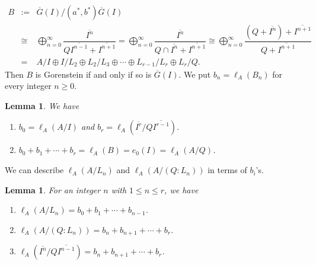 \documentclass[12pt]{amsart}
\newtheorem{lem}[thm]{Lemma}
\theoremstyle{definition}
\theoremstyle{remark}
\numberwithin{equation}{section}
\renewcommand{\:}{\colon}
\begin{document}
\begin{eqnarray*}
B &:= & \overline{G}(I)/(a^{*},b^{*})\overline{G}(I) \\
& \cong & \bigoplus_{n=0}^{\infty} \dfrac{\overline{I^n}}{Q\overline{I^{n-1}}+\overline{I^{n+1}}}   
=  \bigoplus_{n=0}^{\infty} \dfrac{\overline{I^n}}
{Q \cap \overline{I^{n}}+\overline{I^{n+1}}} 
 \cong  \bigoplus_{n=0}^{\infty}  
\dfrac{(Q+ \overline{I^n})+\overline{I^{n+1}}}{Q +\overline{I^{n+1}}} \\
& = & A/I \oplus I/L_2 \oplus L_2/L_3 \oplus \cdots \oplus L_{r-1}/L_r \oplus L_r/Q. 
\end{eqnarray*}
Then $B$ is Gorenstein if and only if so is $\overline{G}(I)$. 
We put $b_n=\ell_A(B_n)$ for every integer   $n \ge 0$. 

\begin{lem} \label{B-lem}
We have
\begin{enumerate}
\item $b_0=\ell_A(A/I)$ and $b_r=\ell_A(\overline{I^r}/Q\overline{I^{r-1}})$. 
\item $b_0+b_1+\cdots+b_r = \ell_A(B)=e_0(I)=\ell_A(A/Q)$. 
\end{enumerate}
\end{lem}

\par \vspace{2mm}
 We can describe $\ell_A(A/L_n)$ and $\ell_A(A/(Q:L_n))$ 
in terms of $b_i$'s.  

\begin{lem} \label{sum-B}
For an integer $n$ 
with $1 \le n \le r$, we have 
\begin{enumerate}
\item $\ell_A(A/L_n)=b_0+b_1+\cdots+b_{n-1}$. 
\item $\ell_A(A/(Q:L_n))=b_n+b_{n+1}+\cdots + b_r$. 
\item $\ell_A(\overline{I^n}/Q\overline{I^{n-1}})=b_n+b_{n+1}+\cdots+b_r$. 
\end{enumerate}
\end{lem}
\end{document}
